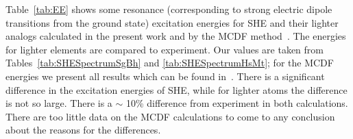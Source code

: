 \documentclass[10pt,a4paper, twoside, openright]{report}
\begin{document}
Table~\ref{tab:EE} shows some resonance (corresponding to strong electric dipole transitions from the ground state) excitation energies for SHE and their lighter analogs calculated in the present work and by the MCDF method~\cite{MCDF-Sg,MCDF-BhHs}. The energies for lighter elements are compared to experiment. Our values are taken from Tables~\ref{tab:SHESpectrumSgBh} and \ref{tab:SHESpectrumHsMt}; for the MCDF energies we present all results which can be found in~\cite{MCDF-Sg,MCDF-BhHs}. There is  a significant difference in the excitation energies of SHE, while for lighter atoms the difference is not so large. There is a $\sim$ 10\% difference from experiment in both calculations. There are too little data on the MCDF calculations to come to any conclusion about the reasons for the differences. %
\end{document}
